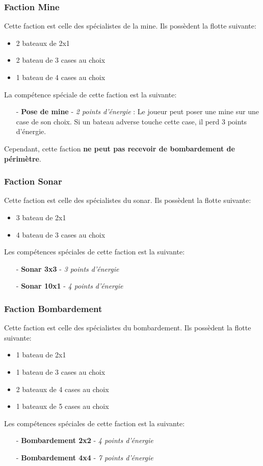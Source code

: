 \documentclass[../besoin_user.tex]{subfiles}
\begin{document}
\subsubsection{Faction Mine}
Cette faction est celle des spécialistes de la mine. Ils possèdent la flotte suivante:
\begin{itemize}
    \item 2 bateaux de 2x1
    \item 2 bateau de 3 cases au choix
    \item 1 bateau de 4 cases au choix
\end{itemize}
La compétence spéciale de cette faction est la suivante:
\begin{itemize}
    \item[-] \textbf{Pose de mine} - \textit{2 points d'énergie} : Le joueur peut poser une mine sur une case de son choix. Si un bateau adverse touche cette case, il perd 3 points d'énergie.
\end{itemize}
Cependant, cette faction \textbf{ne peut pas recevoir de bombardement de périmètre}.

\subsubsection{Faction Sonar}
Cette faction est celle des spécialistes du sonar. Ils possèdent la flotte suivante:
\begin{itemize}
    \item 3 bateau de 2x1
    \item 4 bateau de 3 cases au choix
\end{itemize}

Les compétences spéciales de cette faction est la suivante:
\begin{itemize}
    \item[-] \textbf{Sonar 3x3} - \textit{3 points d'énergie}
    \item[-] \textbf{Sonar 10x1} - \textit{4 points d'énergie} 
\end{itemize}

\subsubsection{Faction Bombardement}
Cette faction est celle des spécialistes du bombardement. Ils possèdent la flotte suivante:
\begin{itemize}
    \item 1 bateau de 2x1
    \item 1 bateau de 3 cases au choix
    \item 2 bateaux de 4 cases au choix
    \item 1 bateaux de 5 cases au choix
\end{itemize}

Les compétences spéciales de cette faction est la suivante:
\begin{itemize}
    \item[-] \textbf{Bombardement 2x2} - \textit{4 points d'énergie}
    \item[-] \textbf{Bombardement 4x4} - \textit{7 points d'énergie}
\end{itemize}
\end{document}
